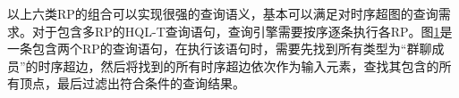 以上六类RP的组合可以实现很强的查询语义，基本可以满足对时序超图的查询需求。对于包含多RP的HQL-T查询语句，查询引擎需要按序逐条执行各RP。图\ref{hql}是一条包含两个RP的查询语句，在执行该语句时，需要先找到所有类型为“群聊成员”的时序超边，然后将找到的所有时序超边依次作为输入元素，查找其包含的所有顶点，最后过滤出符合条件的查询结果。

\begin{figure}[!htb]
\label{hql}
\end{figure}
